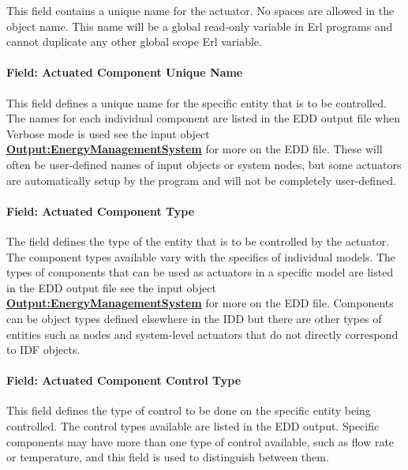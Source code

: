 This field contains a unique name for the actuator. No spaces are allowed in the object name. This name will be a global read-only variable in Erl programs and cannot duplicate any other global scope Erl variable.

\paragraph{Field: Actuated Component Unique Name}\label{field-actuated-component-unique-name-1}

This field defines a unique name for the specific entity that is to be controlled. The names for each individual component are listed in the EDD output file when Verbose mode is used see the input object \textbf{\hyperref[outputenergymanagementsystem]{Output:EnergyManagementSystem}} for more on the EDD file. These will often be user-defined names of input objects or system nodes, but some actuators are automatically setup by the program and will not be completely user-defined.

\paragraph{Field: Actuated Component Type}\label{field-actuated-component-type-1}

The field defines the type of the entity that is to be controlled by the actuator. The component types available vary with the specifics of individual models. The types of components that can be used as actuators in a specific model are listed in the EDD output file see the input object \textbf{\hyperref[outputenergymanagementsystem]{Output:EnergyManagementSystem}} for more on the EDD file. Components can be object types defined elsewhere in the IDD but there are other types of entities such as nodes and system-level actuators that do not directly correspond to IDF objects.

\paragraph{Field: Actuated Component Control Type}\label{field-actuated-component-control-type-1}

This field defines the type of control to be done on the specific entity being controlled. The control types available are listed in the EDD output. Specific components may have more than one type of control available, such as flow rate or temperature, and this field is used to distinguish between them.

